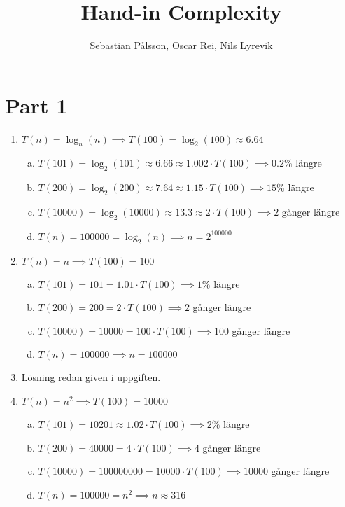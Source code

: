 \documentclass[a4paper]{report}
\title{Hand-in Complexity}
\author{Sebastian Pålsson, Oscar Rei, Nils Lyrevik}
\date{}
\begin{document}
\maketitle

\section*{Part 1}

\begin{enumerate}
    \item $T(n) = \log_n(n) \implies T(100) = \log_2(100) \approx  6.64  $
          \begin{enumerate}[(a)]
              \item $T(101) = \log_2(101) \approx  6.66 \approx 1.002 \cdot T(100) \implies 0.2 \%$ längre
              \item $T(200) = \log_2(200) \approx  7.64 \approx 1.15 \cdot T(100) \implies 15 \%$ längre
              \item $T(10000) = \log_2(10000) \approx  13.3 \approx 2 \cdot T(100) \implies 2 $ gånger längre
              \item $T(n) = 100000 = \log_2(n) \implies n = 2^{100000}$
          \end{enumerate}
    \item $T(n) = n \implies T(100) = 100   $
          \begin{enumerate}[(a)]
              \item $T(101) = 101 = 1.01 \cdot T(100) \implies 1 \%$ längre
              \item $T(200) = 200 = 2 \cdot T(100) \implies 2$ gånger längre
              \item $T(10000) = 10000 = 100 \cdot T(100) \implies 100$ gånger längre
              \item $T(n) = 100000 \implies n = 100000$
          \end{enumerate}
    \item Lösning redan given i uppgiften.
    \item $T(n) = n^{2} \implies T(100) = 10000$
          \begin{enumerate}[(a)]
              \item $T(101) = 10201 \approx  1.02 \cdot T(100) \implies 2 \%$ längre
              \item $T(200) = 40000 = 4 \cdot T(100) \implies 4$ gånger längre
              \item $T(10000) = 100000000 = 10000 \cdot T(100) \implies 10000$ gånger längre
              \item $T(n) = 100000 = n^{2} \implies n \approx  316 $

\end{enumerate}
\end{enumerate}
\end{document}
